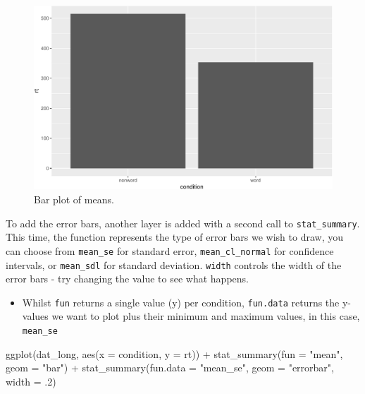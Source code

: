 \documentclass[
  english,
  doc,floatsintext]{apa6}
\newenvironment{Shaded}{\begin{snugshade}}{\end{snugshade}}
\newcommand{\AttributeTok}[1]{\textcolor[rgb]{0.77,0.63,0.00}{#1}}
\newcommand{\DecValTok}[1]{\textcolor[rgb]{0.00,0.00,0.81}{#1}}
\newcommand{\FunctionTok}[1]{\textcolor[rgb]{0.00,0.00,0.00}{#1}}
\newcommand{\NormalTok}[1]{#1}
\newcommand{\SpecialCharTok}[1]{\textcolor[rgb]{0.00,0.00,0.00}{#1}}
\newcommand{\StringTok}[1]{\textcolor[rgb]{0.31,0.60,0.02}{#1}}
\providecommand{\tightlist}{%
  \setlength{\itemsep}{0pt}\setlength{\parskip}{0pt}}
\begin{document}
\begin{figure}

{\centering \includegraphics[width=1\linewidth]{images/badbar1-1} 

}

\caption{Bar plot of means.}\label{fig:badbar1}
\end{figure}

To add the error bars, another layer is added with a second call to \texttt{stat\_summary}. This time, the function represents the type of error bars we wish to draw, you can choose from \texttt{mean\_se} for standard error, \texttt{mean\_cl\_normal} for confidence intervals, or \texttt{mean\_sdl} for standard deviation. \texttt{width} controls the width of the error bars - try changing the value to see what happens.

\begin{itemize}
\tightlist
\item
  Whilst \texttt{fun} returns a single value (y) per condition, \texttt{fun.data} returns the y-values we want to plot plus their minimum and maximum values, in this case, \texttt{mean\_se}
\end{itemize}

\begin{Shaded}
\begin{Highlighting}[]
\FunctionTok{ggplot}\NormalTok{(dat\_long, }\FunctionTok{aes}\NormalTok{(}\AttributeTok{x =}\NormalTok{ condition, }\AttributeTok{y =}\NormalTok{ rt)) }\SpecialCharTok{+}
  \FunctionTok{stat\_summary}\NormalTok{(}\AttributeTok{fun =} \StringTok{"mean"}\NormalTok{, }\AttributeTok{geom =} \StringTok{"bar"}\NormalTok{) }\SpecialCharTok{+}
  \FunctionTok{stat\_summary}\NormalTok{(}\AttributeTok{fun.data =} \StringTok{"mean\_se"}\NormalTok{, }\AttributeTok{geom =} \StringTok{"errorbar"}\NormalTok{, }\AttributeTok{width =}\NormalTok{ .}\DecValTok{2}\NormalTok{)}
\end{Highlighting}
\end{Shaded}
\end{document}
